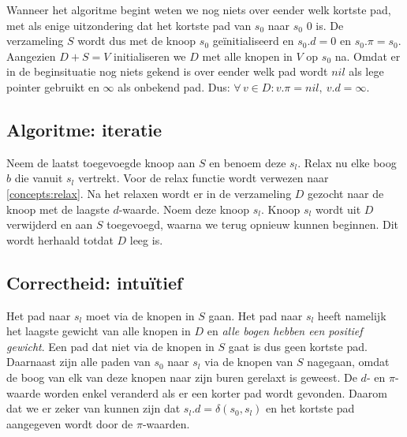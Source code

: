 \documentclass[conference]{IEEEtran}
\theoremstyle{definition}
\let \oldforall \forall
\renewcommand{\forall}{\oldforall\,}
\begin{document}
Wanneer het algoritme begint weten we nog niets over eender welk kortste pad, met als enige uitzondering dat het kortste pad van $s_0$ naar $s_0$ $0$ is. De verzameling $S$ wordt dus met de knoop $s_0$ geïnitialiseerd en $s_{0}.d = 0$ en $s_{0}.\pi = s_0$. Aangezien $D + S = V$ initialiseren we $D$ met alle knopen in $V$ op $s_0$ na. Omdat er in de beginsituatie nog niets gekend is over eender welk pad wordt $nil$ als lege pointer gebruikt en $\infty$ als onbekend pad. Dus: $\forall v \in D: v.\pi = nil,\ v.d = \infty$.

\subsection{Algoritme: iteratie}
Neem de laatst toegevoegde knoop aan $S$ en benoem deze $s_l$. Relax nu elke boog $b$ die vanuit $s_l$ vertrekt. Voor de relax functie wordt verwezen naar \ref{concepts:relax}. Na het relaxen wordt er in de verzameling $D$ gezocht naar de knoop met de laagste $d$-waarde. Noem deze knoop $s_l$. Knoop $s_l$ wordt uit $D$ verwijderd en aan $S$ toegevoegd, waarna we terug opnieuw kunnen beginnen. Dit wordt herhaald totdat $D$ leeg is.

\subsection{Correctheid: intuïtief}
Het pad naar $s_l$ moet via de knopen in $S$ gaan. Het pad naar $s_l$ heeft namelijk het laagste gewicht van alle knopen in $D$ en \emph{alle bogen hebben een positief gewicht}. Een pad dat niet via de knopen in $S$ gaat is dus geen kortste pad. Daarnaast zijn alle paden van $s_0$ naar $s_l$ via de knopen van $S$ nagegaan, omdat de boog van elk van deze knopen naar zijn buren gerelaxt is geweest. De $d$- en $\pi$-waarde worden enkel veranderd als er een korter pad wordt gevonden. Daarom dat we er zeker van kunnen zijn dat $s_l.d = \delta(s_0, s_l)$ en het kortste pad aangegeven wordt door de $\pi$-waarden.
\end{document}
